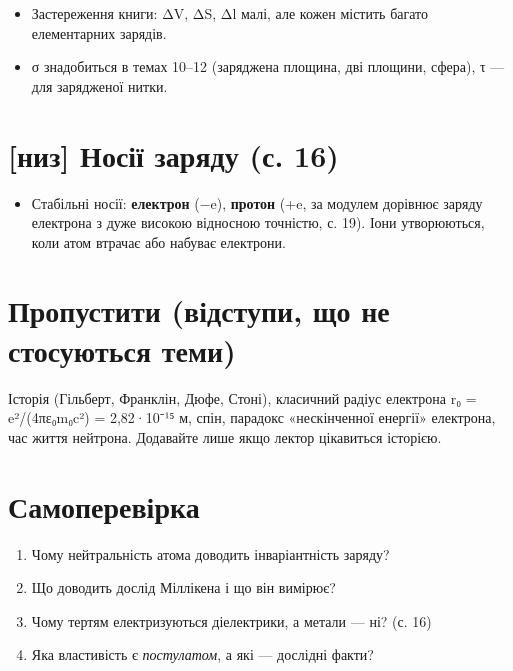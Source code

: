 \documentclass[11pt,a4paper,oneside]{book}
\begin{document}
\begin{itemize}
\item Застереження книги: ΔV, ΔS, Δl малі, але кожен містить багато елементарних зарядів.
\item σ знадобиться в темах 10–12 (заряджена площина, дві площини, сфера), τ — для зарядженої нитки.
\end{itemize}

\section*{[низ] Носії заряду (с. 16)}

\begin{itemize}
\item Стабільні носії: \textbf{електрон} (−e), \textbf{протон} (+e, за модулем дорівнює заряду електрона з дуже високою відносною точністю, с. 19). Іони утворюються, коли атом втрачає або набуває електрони.
\end{itemize}

\par\noindent{\color{accent!30}\rule{\linewidth}{0.4pt}}\par

\section*{Пропустити (відступи, що не стосуються теми)}

Історія (Гільберт, Франклін, Дюфе, Стоні), класичний радіус електрона r₀ = e²/(4πε₀m₀c²) = 2,82·10⁻¹⁵ м, спін, парадокс «нескінченної енергії» електрона, час життя нейтрона. Додавайте лише якщо лектор цікавиться історією.

\section*{Самоперевірка}

\begin{enumerate}
\item Чому нейтральність атома доводить інваріантність заряду?
\item Що доводить дослід Міллікена і що він вимірює?
\item Чому тертям електризуються діелектрики, а метали — ні? (с. 16)
\item Яка властивість є \textit{постулатом}, а які — дослідні факти?
\end{enumerate}
\end{document}
